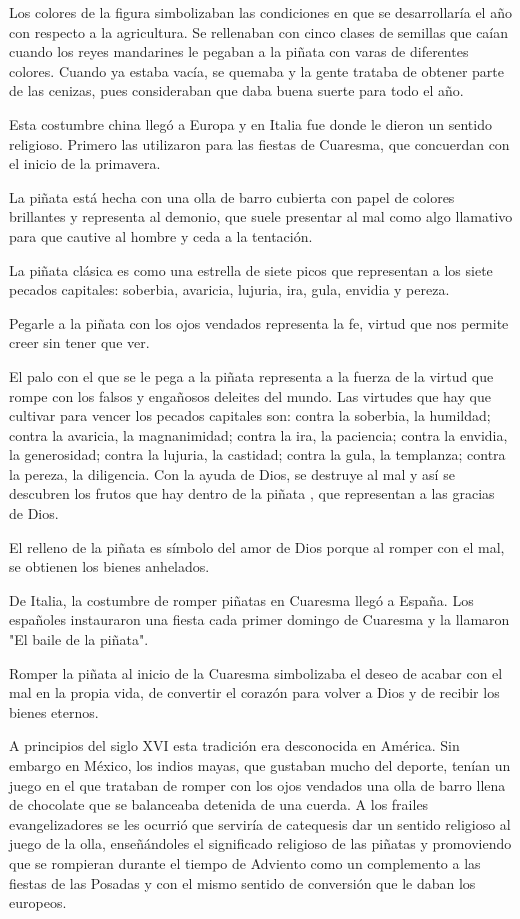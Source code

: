 Los colores de la figura simbolizaban las condiciones en que se desarrollaría el año con respecto a la agricultura. Se rellenaban con cinco clases de semillas que caían cuando los reyes mandarines le pegaban a la piñata con varas de diferentes colores. Cuando ya estaba vacía, se quemaba y la gente trataba de obtener parte de las cenizas, pues consideraban que daba buena suerte para todo el año.

Esta costumbre china llegó a Europa y en Italia fue donde le dieron un sentido religioso. Primero las utilizaron para las fiestas de Cuaresma, que concuerdan con el inicio de la primavera.

La piñata está hecha con una olla de barro cubierta con papel de colores brillantes y representa al demonio, que suele presentar al mal como algo llamativo para que cautive al hombre y ceda a la tentación.

La piñata clásica es como una estrella de siete picos que representan a los siete pecados capitales: soberbia, avaricia, lujuria, ira, gula, envidia y pereza.

Pegarle a la piñata con los ojos vendados representa la fe, virtud que nos permite creer sin tener que ver.

El palo con el que se le pega a la piñata representa a la fuerza de la virtud que rompe con los falsos y engañosos deleites del mundo. Las virtudes que hay que cultivar para vencer los pecados capitales son: contra la soberbia, la humildad; contra la avaricia, la magnanimidad; contra la ira, la paciencia; contra la envidia, la generosidad; contra la lujuria, la castidad; contra la gula, la templanza; contra la pereza, la diligencia. Con la ayuda de Dios, se destruye al mal y así se descubren los frutos que hay dentro de la piñata , que representan a las gracias de Dios.

El relleno de la piñata es símbolo del amor de Dios porque al romper con el mal, se obtienen los bienes anhelados.

De Italia, la costumbre de romper piñatas en Cuaresma llegó a España. Los españoles instauraron una fiesta cada primer domingo de Cuaresma y la llamaron "El baile de la piñata".

Romper la piñata al inicio de la Cuaresma simbolizaba el deseo de acabar con el mal en la propia vida, de convertir el corazón para volver a Dios y de recibir los bienes eternos.

A principios del siglo XVI esta tradición era desconocida en América. Sin embargo en México, los indios mayas, que gustaban mucho del deporte, tenían un juego en el que trataban de romper con los ojos vendados una olla de barro llena de chocolate que se balanceaba detenida de una cuerda. A los frailes evangelizadores se les ocurrió que serviría de catequesis dar un sentido religioso al juego de la olla, enseñándoles el significado religioso de las piñatas y promoviendo que se rompieran durante el tiempo de Adviento como un complemento a las fiestas de las Posadas y con el mismo sentido de conversión que le daban los europeos.

